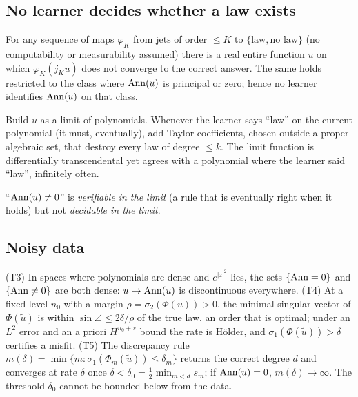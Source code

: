 \subsection{No learner decides whether a law exists}

\begin{theorem}\label{thm:convt2}
For any sequence of maps $\varphi_K$ from jets of order $\le K$ to $\{\text{law},\text{no law}\}$ (no computability or measurability assumed) there is a real entire function $u$ on which $\varphi_K(j_Ku)$ does not converge to the correct answer. The same holds restricted to the class where $\operatorname{Ann}(u)$ is principal or zero; hence no learner identifies $\operatorname{Ann}(u)$ on that class.
\end{theorem}

\begin{intuition}
Build $u$ as a limit of polynomials. Whenever the learner says ``law'' on the current polynomial (it must, eventually), add Taylor coefficients, chosen outside a proper algebraic set, that destroy every law of degree $\le k$. The limit function is differentially transcendental yet agrees with a polynomial where the learner said ``law'', infinitely often.
\end{intuition}

\begin{keypoint}
``$\operatorname{Ann}(u)\ne0$'' is \emph{verifiable in the limit} (a rule that is eventually right when it holds) but not \emph{decidable in the limit}.
\end{keypoint}

\subsection{Noisy data}

\begin{theorem}\label{thm:convt45}
(T3) In spaces where polynomials are dense and $e^{|z|^2}$ lies, the sets $\{\operatorname{Ann}=0\}$ and $\{\operatorname{Ann}\ne0\}$ are both dense: $u\mapsto\operatorname{Ann}(u)$ is discontinuous everywhere. (T4) At a fixed level $n_0$ with a margin $\rho=\sigma_2(\Phi(u))>0$, the minimal singular vector of $\Phi(\tilde u)$ is within $\sin\angle\le2\delta/\rho$ of the true law, an order that is optimal; under an $L^2$ error and an a priori $H^{n_0+s}$ bound the rate is H\"older, and $\sigma_1(\Phi(\tilde u))>\delta$ certifies a misfit. (T5) The discrepancy rule $m(\delta)=\min\{m:\sigma_1(\Phi_m(\tilde u))\le\delta_m\}$ returns the correct degree $d$ and converges at rate $\delta$ once $\delta<\delta_0=\tfrac12\min_{m<d}s_m$; if $\operatorname{Ann}(u)=0$, $m(\delta)\to\infty$. The threshold $\delta_0$ cannot be bounded below from the data.
\end{theorem}

